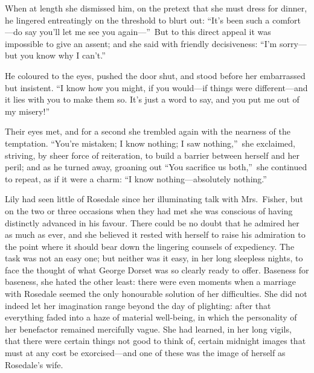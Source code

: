 \documentclass[12pt,a4paper]{book}
\begin{document}
When at length she dismissed him, on the pretext that she must
dress for dinner, he lingered entreatingly on the threshold to
blurt out: ``It's been such a comfort---do say you'll let me see
you again---''\ But to this direct appeal it was impossible to give
an assent; and she said with friendly decisiveness: ``I'm
sorry---but you know why I can't.''





He coloured to the eyes, pushed the door shut, and stood before
her embarrassed but insistent. ``I know how you might, if you
would---if things were different---and it lies with you to make
them so. It's just a word to say, and you put me out of my
misery!''





Their eyes met, and for a second she trembled again with the
nearness of the temptation. ``You're mistaken; I know nothing; I
saw nothing,''\ she exclaimed, striving, by sheer force of
reiteration, to build a barrier between herself and her peril;
and as he turned away, groaning out ``You sacrifice us both,''\ she
continued to repeat, as if it were a charm: ``I know
nothing---absolutely nothing.''







Lily had seen little of Rosedale since her illuminating talk with
Mrs.\ Fisher, but on the two or three occasions when they had met
she was conscious of having distinctly advanced in his favour. 
There could be no doubt that he admired her as much as ever, and
she believed it rested with herself to raise his admiration to
the point where it should bear down the lingering counsels of
expediency. The task was not an easy one; but neither was it
easy, in her long sleepless nights, to face the thought of what
George Dorset was so clearly ready to offer. Baseness for
baseness, she hated the other least: there were even moments when
a marriage with Rosedale seemed the only honourable solution of
her difficulties. She did not indeed let her imagination range
beyond the day of plighting: after that everything faded into a
haze of material well-being, in which the personality of her
benefactor remained mercifully vague. She had learned, in her
long vigils, that there were certain things not good to think of,
certain midnight images that must at any cost be exorcised---and
one of these was the image of herself as Rosedale's wife.
\end{document}
